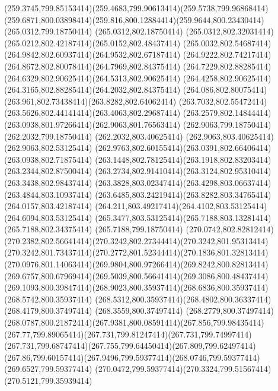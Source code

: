 {{	\curveto(259.3745,799.85153414)(259.4683,799.90613414)(259.5738,799.96868414)
	\curveto(259.6871,800.03898414)(259.816,800.12884414)(259.9644,800.23430414)
	\closepath
	\moveto(265.0312,799.18750414)
	\lineto(265.0312,802.18750414)
	\curveto(265.0312,802.32031414)(265.0212,802.42187414)(265.0152,802.48437414)
	\curveto(265.0032,802.54687414)(264.9842,802.60937414)(264.9532,802.67187414)
	\curveto(264.9222,802.74217414)(264.8672,802.80078414)(264.7969,802.84375414)
	\curveto(264.7229,802.88285414)(264.6329,802.90625414)(264.5313,802.90625414)
	\curveto(264.4258,802.90625414)(264.3165,802.88285414)(264.2032,802.84375414)
	\curveto(264.086,802.80075414)(263.961,802.73438414)(263.8282,802.64062414)
	\curveto(263.7032,802.55472414)(263.5626,802.44141414)(263.4063,802.29687414)
	\curveto(263.2579,802.14844414)(263.0938,801.97266414)(262.9063,801.76563414)
	\lineto(262.9063,799.18750414)
	\lineto(262.2032,799.18750414)
	\lineto(262.2032,803.40625414)
	\lineto(262.9063,803.40625414)
	\lineto(262.9063,802.53125414)
	\curveto(262.9763,802.60155414)(263.0391,802.66406414)(263.0938,802.71875414)
	\curveto(263.1448,802.78125414)(263.1918,802.83203414)(263.2344,802.87500414)
	\curveto(263.2734,802.91410414)(263.3124,802.95310414)(263.3438,802.98437414)
	\curveto(263.3828,803.02347414)(263.4298,803.06637414)(263.4844,803.10937414)
	\curveto(263.6485,803.24219414)(263.8282,803.34765414)(264.0157,803.42187414)
	\curveto(264.211,803.49217414)(264.4102,803.53125414)(264.6094,803.53125414)
	\curveto(265.3477,803.53125414)(265.7188,803.13281414)(265.7188,802.34375414)
	\lineto(265.7188,799.18750414)
	\closepath
	\moveto(270.0742,802.82812414)
	\curveto(270.2382,802.56641414)(270.3242,802.27344414)(270.3242,801.95313414)
	\curveto(270.3242,801.73437414)(270.2772,801.52344414)(270.1836,801.32813414)
	\curveto(270.0976,801.14063414)(269.9804,800.97266414)(269.8242,800.82813414)
	\curveto(269.6757,800.67969414)(269.5039,800.56641414)(269.3086,800.48437414)
	\curveto(269.1093,800.39847414)(268.9023,800.35937414)(268.6836,800.35937414)
	\lineto(268.5742,800.35937414)
	\curveto(268.5312,800.35937414)(268.4802,800.36337414)(268.4179,800.37497414)
	\lineto(268.3559,800.37497414)
	\lineto(268.2779,800.37497414)
	\curveto(268.0787,800.21872414)(267.9381,800.08591414)(267.856,799.98435414)
	\curveto(267.77,799.89065414)(267.731,799.81247414)(267.731,799.74997414)
	\curveto(267.731,799.68747414)(267.755,799.64450414)(267.809,799.62497414)
	\curveto(267.86,799.60157414)(267.9496,799.59377414)(268.0746,799.59377414)
	\lineto(269.6527,799.59377414)
	\curveto(270.0472,799.59377414)(270.3324,799.51567414)(270.5121,799.35939414)
}}
